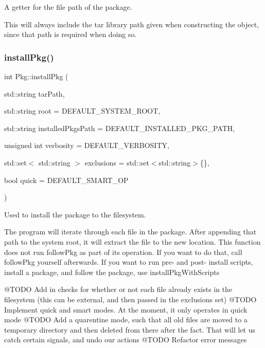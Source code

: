A getter for the file path of the package. 

This will always include the tar library path given when constructing the object, since that path is required when doing so. \mbox{\label{classPkg_a3892025f27bebfeb07342f6b24284b88}} 
\subsubsection{\texorpdfstring{installPkg()}{installPkg()}\hspace{0.1cm}{\footnotesize\ttfamily [1/2]}}
{\footnotesize\ttfamily int Pkg\+::install\+Pkg (\begin{DoxyParamCaption}\item[{std\+::string}]{tar\+Path,  }\item[{std\+::string}]{root = {\ttfamily DEFAULT\+\_\+SYSTEM\+\_\+ROOT},  }\item[{std\+::string}]{installed\+Pkgs\+Path = {\ttfamily DEFAULT\+\_\+INSTALLED\+\_\+PKG\+\_\+PATH},  }\item[{unsigned int}]{verbosity = {\ttfamily DEFAULT\+\_\+VERBOSITY},  }\item[{std\+::set$<$ std\+::string $>$}]{exclusions = {\ttfamily std\+:\+:set$<$std\+:\+:string$>$\{\}},  }\item[{bool}]{quick = {\ttfamily DEFAULT\+\_\+SMART\+\_\+OP} }\end{DoxyParamCaption})}



Used to install the package to the filesystem. 

The program will iterate through each file in the package. After appending that path to the system root, it will extract the file to the new location. This function does not run follow\+Pkg as part of its operation. If you want to do that, call follow\+Pkg yourself afterwards. If you want to run pre-\/ and post-\/ install scripts, install a package, and follow the package, use install\+Pkg\+With\+Scripts

@\+T\+O\+DO Add in checks for whether or not each file already exists in the filesystem (this can be external, and then passed in the exclusions set) @\+T\+O\+DO Implement quick and smart modes. At the moment, it only operates in quick mode @\+T\+O\+DO Add a quarentine mode, such that all old files are moved to a temporary directory and then deleted from there after the fact. That will let us catch certain signals, and undo our actions @\+T\+O\+DO Refactor error messages


